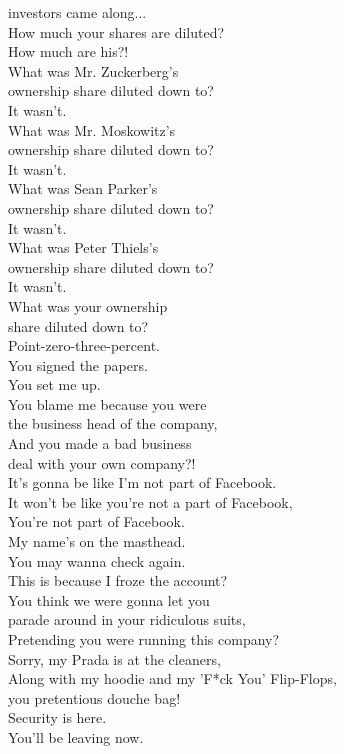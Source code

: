 \documentclass{article}
\begin{document}
\begin{multicols}{3}
investors came along...\\
How much your shares are diluted?\\
How much are his?!\\
What was Mr. Zuckerberg's\\
ownership share diluted down to?\\
It wasn't.\\
What was Mr. Moskowitz's\\
ownership share diluted down to?\\
It wasn't.\\
What was Sean Parker's\\
ownership share diluted down to?\\
It wasn't.\\
What was Peter Thiels's\\
ownership share diluted down to?\\
It wasn't.\\
What was your ownership\\
share diluted down to?\\
Point-zero-three-percent.\\
You signed the papers.\\
You set me up.\\
You blame me because you were\\
the business head of the company,\\
And you made a bad business\\
deal with your own company?!\\
It's gonna be like I'm not part of Facebook.\\
It won't be like you're not a part of Facebook,\\
You're not part of Facebook.\\
My name's on the masthead.\\
You may wanna check again.\\
This is because I froze the account?\\
You think we were gonna let you\\
parade around in your ridiculous suits,\\
Pretending you were running this company?\\
Sorry, my Prada is at the cleaners,\\
Along with my hoodie and my 'F*ck You' Flip-Flops,\\
you pretentious douche bag!\\
Security is here.\\
You'll be leaving now.\\

\end{multicols}
\end{document}
